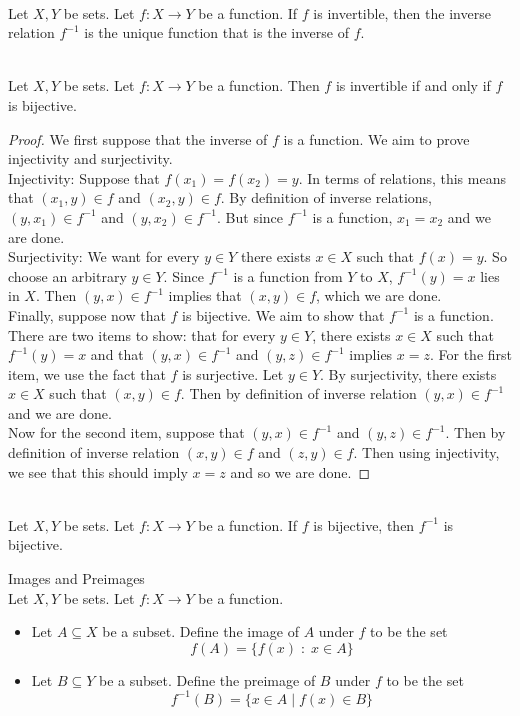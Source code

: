 \documentclass[a4paper]{article}
\begin{document}
\begin{prp}{}{}\\
Let $X,Y$ be sets. Let $f:X\to Y$ be a function. If $f$ is invertible, then the inverse relation $f^{-1}$ is the unique function that is the inverse of $f$. 
\end{prp}

\begin{thm}{}{}\\
Let $X,Y$ be sets. Let $f:X\to Y$ be a function. Then $f$ is invertible if and only if $f$ is bijective. 
\begin{proof}
We first suppose that the inverse of $f$ is a function. We aim to prove injectivity and surjectivity. \\
Injectivity: Suppose that $f(x_1)=f(x_2)=y$. In terms of relations, this means that $(x_1,y)\in f$ and $(x_2,y)\in f$. By definition of inverse relations, $(y,x_1)\in f^{-1}$ and $(y,x_2)\in f^{-1}$. But since $f^{-1}$ is a function, $x_1=x_2$ and we are done. \\
Surjectivity: We want for every $y\in Y$ there exists $x\in X$ such that $f(x)=y$. So choose an arbitrary $y\in Y$. Since $f^{-1}$ is a function from $Y$ to $X$, $f^{-1}(y)=x$ lies in $X$. Then $(y,x)\in f^{-1}$ implies that $(x,y)\in f$, which we are done. \\

Finally, suppose now that $f$ is bijective. We aim to show that $f^{-1}$ is a function. There are two items to show: that for every $y\in Y$, there exists $x\in X$ such that $f^{-1}(y)=x$ and that $(y,x)\in f^{-1}$ and $(y,z)\in f^{-1}$ implies $x=z$. For the first item, we use the fact that $f$ is surjective. Let $y\in Y$. By surjectivity, there exists $x\in X$ such that $(x,y)\in f$. Then by definition of inverse relation $(y,x)\in f^{-1}$ and we are done. \\
Now for the second item, suppose that $(y,x)\in f^{-1}$ and $(y,z)\in f^{-1}$. Then by definition of inverse relation $(x,y)\in f$ and $(z,y)\in f$. Then using injectivity, we see that this should imply $x=z$ and so we are done. 
\end{proof}
\end{thm}

\begin{crl}{}{}\\
Let $X,Y$ be sets. Let $f:X\to Y$ be a function. If $f$ is bijective, then $f^{-1}$ is bijective. 
\end{crl}

\begin{defn}{Images and Preimages}{}\\
Let $X,Y$ be sets. Let $f:X\to Y$ be a function. 
\begin{itemize}
\item Let $A\subseteq X$ be a subset. Define the image of $A$ under $f$ to be the set $$f(A)=\{f(x)\;:\;x\in A\}$$
\item Let $B\subseteq Y$ be a subset. Define the preimage of $B$ under $f$ to be the set $$f^{-1}(B)=\{x\in A\;|\;f(x)\in B\}$$
\end{itemize}
\end{defn}
\end{document}
